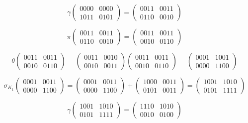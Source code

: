 \documentclass[a4paper]{article}
\begin{document}
$$\gamma \begin{pmatrix} 0000 & 0000 \\ 1011 & 0101 \end{pmatrix} = \begin{pmatrix} 0011 & 0011 \\ 0110 & 0010 \end{pmatrix}$$

$$\pi \begin{pmatrix} 0011 & 0011 \\ 0110 & 0010 \end{pmatrix} = \begin{pmatrix} 0011 & 0011 \\ 0010 & 0110 \end{pmatrix}$$

$$\theta \begin{pmatrix} 0011 & 0011 \\ 0010 & 0110 \end{pmatrix} = \begin{pmatrix} 0011 & 0010 \\ 0010 & 0011 \end{pmatrix}\begin{pmatrix} 0011 & 0011 \\ 0010 & 0110 \end{pmatrix} = \begin{pmatrix} 0001 & 1001 \\ 0000 & 1100 \end{pmatrix}$$

$$\sigma_{K_1} \begin{pmatrix} 0001 & 0011 \\ 0000 & 1100 \end{pmatrix} = \begin{pmatrix} 0001 & 0011 \\ 0000 & 1100 \end{pmatrix} + \begin{pmatrix} 1000 & 0011 \\ 0101 & 0011 \end{pmatrix} = \begin{pmatrix} 1001 & 1010 \\ 0101 & 1111 \end{pmatrix}$$

$$\gamma \begin{pmatrix} 1001 & 1010 \\ 0101 & 1111 \end{pmatrix} = \begin{pmatrix} 1110 & 1010 \\ 0010 & 0100 \end{pmatrix}$$
\end{document}
